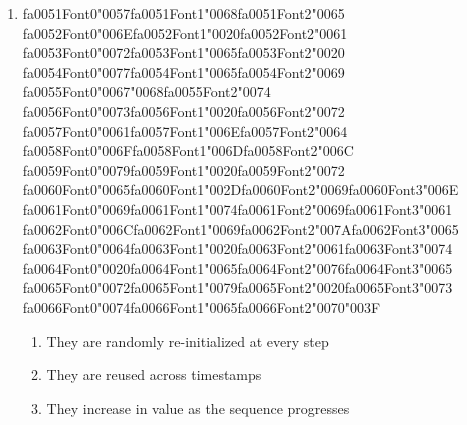 \documentclass[12pt]{article}
\begin{document}
\begin{enumerate}[label=Q\arabic*.]
\item {\csname fa0051Font0\endcsname\char"0057}{\csname fa0051Font1\endcsname\char"0068}{\csname fa0051Font2\endcsname\char"0065} {\csname fa0052Font0\endcsname\char"006E}{\csname fa0052Font1\endcsname\char"0020}{\csname fa0052Font2\endcsname\char"0061} {\csname fa0053Font0\endcsname\char"0072}{\csname fa0053Font1\endcsname\char"0065}{\csname fa0053Font2\endcsname\char"0020} {\csname fa0054Font0\endcsname\char"0077}{\csname fa0054Font1\endcsname\char"0065}{\csname fa0054Font2\endcsname\char"0069} {\csname fa0055Font0\endcsname\char"0067}{\char"0068}{\csname fa0055Font2\endcsname\char"0074} {\csname fa0056Font0\endcsname\char"0073}{\csname fa0056Font1\endcsname\char"0020}{\csname fa0056Font2\endcsname\char"0072} {\csname fa0057Font0\endcsname\char"0061}{\csname fa0057Font1\endcsname\char"006E}{\csname fa0057Font2\endcsname\char"0064} {\csname fa0058Font0\endcsname\char"006F}{\csname fa0058Font1\endcsname\char"006D}{\csname fa0058Font2\endcsname\char"006C} {\csname fa0059Font0\endcsname\char"0079}{\csname fa0059Font1\endcsname\char"0020}{\csname fa0059Font2\endcsname\char"0072} {\csname fa0060Font0\endcsname\char"0065}{\csname fa0060Font1\endcsname\char"002D}{\csname fa0060Font2\endcsname\char"0069}{\csname fa0060Font3\endcsname\char"006E} {\csname fa0061Font0\endcsname\char"0069}{\csname fa0061Font1\endcsname\char"0074}{\csname fa0061Font2\endcsname\char"0069}{\csname fa0061Font3\endcsname\char"0061} {\csname fa0062Font0\endcsname\char"006C}{\csname fa0062Font1\endcsname\char"0069}{\csname fa0062Font2\endcsname\char"007A}{\csname fa0062Font3\endcsname\char"0065} {\csname fa0063Font0\endcsname\char"0064}{\csname fa0063Font1\endcsname\char"0020}{\csname fa0063Font2\endcsname\char"0061}{\csname fa0063Font3\endcsname\char"0074} {\csname fa0064Font0\endcsname\char"0020}{\csname fa0064Font1\endcsname\char"0065}{\csname fa0064Font2\endcsname\char"0076}{\csname fa0064Font3\endcsname\char"0065} {\csname fa0065Font0\endcsname\char"0072}{\csname fa0065Font1\endcsname\char"0079}{\csname fa0065Font2\endcsname\char"0020}{\csname fa0065Font3\endcsname\char"0073} {\csname fa0066Font0\endcsname\char"0074}{\csname fa0066Font1\endcsname\char"0065}{\csname fa0066Font2\endcsname\char"0070}{\char"003F}
\begin{enumerate}[label=(\Alph*)]
    \item They are randomly re-initialized at every step
    \item They are reused across timestamps
    \item They increase in value as the sequence progresses

\end{enumerate}
\end{enumerate}
\end{document}
